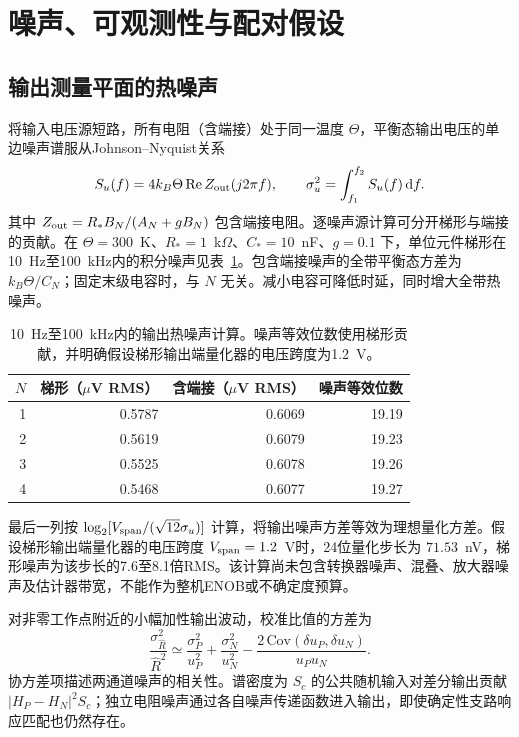 \section{噪声、可观测性与配对假设}
\label{sec:noise-pairing}

\subsection{输出测量平面的热噪声}

将输入电压源短路，所有电阻（含端接）处于同一温度 $\Theta$，平衡态输出电压的单边噪声谱服从Johnson--Nyquist关系\citep{johnson1928thermal,nyquist1928thermal}
\begin{equation}\label{eq:thermal-noise}
S_{u}(f)=4k_B\Theta\,\mathrm{Re}\,Z_{\rm out}(j2\pi f),\qquad
\sigma_u^2=\int_{f_1}^{f_2}S_u(f)\,\mathrm df.
\end{equation}
其中 $Z_{\rm out}=R_*B_N/(A_N+gB_N)$ 包含端接电阻。逐噪声源计算可分开梯形与端接的贡献。在 $\Theta=300$~K、$R_*=1$~k$\Omega$、$C_*=10$~nF、$g=0.1$ 下，单位元件梯形在10~Hz至100~kHz内的积分噪声见表~\ref{tab:noise}。包含端接噪声的全带平衡态方差为 $k_B\Theta/C_N$；固定末级电容时，与 $N$ 无关。减小电容可降低时延，同时增大全带热噪声。

\begin{table}[htbp]
\centering
\caption{10~Hz至100~kHz内的输出热噪声计算。噪声等效位数使用梯形贡献，并明确假设梯形输出端量化器的电压跨度为1.2~V。}
\label{tab:noise}
\begin{tabular}{rrrr}
\toprule
$N$ & 梯形（$\mu$V RMS） & 含端接（$\mu$V RMS） & 噪声等效位数 \\
\midrule
1 & 0.5787 & 0.6069 & 19.19 \\
2 & 0.5619 & 0.6079 & 19.23 \\
3 & 0.5525 & 0.6078 & 19.26 \\
4 & 0.5468 & 0.6077 & 19.27 \\
\bottomrule
\end{tabular}
\end{table}

最后一列按 $\log_2[V_{\rm span}/(\sqrt{12}\sigma_u)]$ 计算，将输出噪声方差等效为理想量化方差。假设梯形输出端量化器的电压跨度 $V_{\rm span}=1.2$~V时，24位量化步长为 $71.53$~nV，梯形噪声为该步长的7.6至8.1倍RMS。该计算尚未包含转换器噪声、混叠、放大器噪声及估计器带宽，不能作为整机ENOB或不确定度预算。

对非零工作点附近的小幅加性输出波动，校准比值的方差为
\begin{equation}\label{eq:ratio-noise}
\frac{\sigma_{\hat R}^2}{\hat R^2}\simeq
\frac{\sigma_P^2}{u_P^2}+\frac{\sigma_N^2}{u_N^2}
-\frac{2\,\mathrm{Cov}(\delta u_P,\delta u_N)}{u_Pu_N}.
\end{equation}
协方差项描述两通道噪声的相关性。谱密度为 $S_c$ 的公共随机输入对差分输出贡献 $|H_P-H_N|^2S_c$；独立电阻噪声通过各自噪声传递函数进入输出，即使确定性支路响应匹配也仍然存在。

